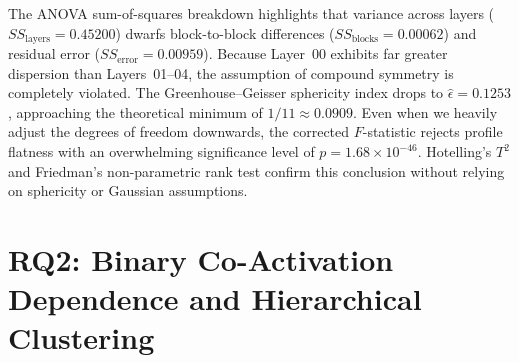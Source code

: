 \documentclass[12pt, a4paper, oneside]{report}
\theoremstyle{definition}
\begin{document}
\begin{table}[htbp]
    \centering
    \caption{Multivariate and non-parametric hypothesis tests for layer-wise sparsity profile flatness (RQ1, $n = 40$ blocks, $q = 12$ layers).}
    \label{tab:rq1_tests}
    \small
    \setlength{\tabcolsep}{6pt}
    \noindent{}
\end{table}

The ANOVA sum-of-squares breakdown highlights that variance across layers ($SS_{\text{layers}} = 0.45200$) dwarfs block-to-block differences ($SS_{\text{blocks}} = 0.00062$) and residual error ($SS_{\text{error}} = 0.00959$). Because Layer~00 exhibits far greater dispersion than Layers~01--04, the assumption of compound symmetry is completely violated. The Greenhouse--Geisser sphericity index drops to $\hat{\epsilon} = 0.1253$, approaching the theoretical minimum of $1/11 \approx 0.0909$. Even when we heavily adjust the degrees of freedom downwards, the corrected $F$-statistic rejects profile flatness with an overwhelming significance level of $p = 1.68 \times 10^{-46}$. Hotelling's $T^2$ and Friedman's non-parametric rank test confirm this conclusion without relying on sphericity or Gaussian assumptions.

\section{RQ2: Binary Co-Activation Dependence and Hierarchical Clustering}
\end{document}
